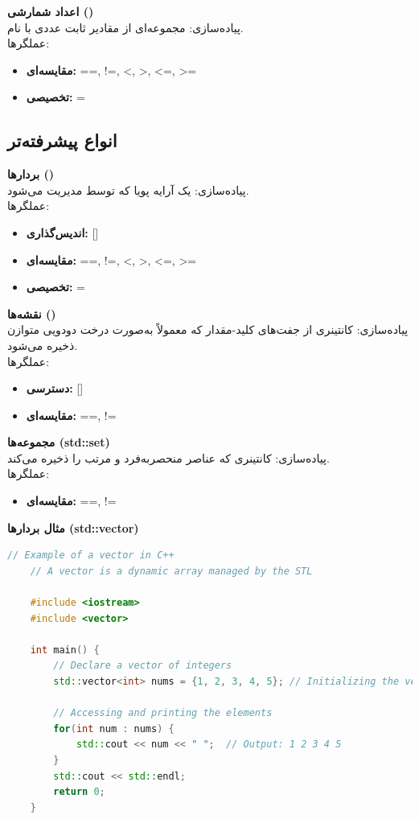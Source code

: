 \documentclass[12pt, a4paper]{report}
\begin{document}
\textbf{اعداد شمارشی ()} \\
پیاده‌سازی: مجموعه‌ای از مقادیر ثابت عددی با نام. \\
عملگرها:
\begin{itemize}
	\item \textbf{مقایسه‌ای:} ==, !=, <, >, <=, >=
	\item \textbf{تخصیصی:} =
\end{itemize}

\subsection{انواع پیشرفته‌تر}

\textbf{بردارها ()} \\
پیاده‌سازی: یک آرایه پویا که توسط  مدیریت می‌شود. \\
عملگرها:
\begin{itemize}
	\item \textbf{اندیس‌گذاری:} []
	\item \textbf{مقایسه‌ای:} ==, !=, <, >, <=, >=
	\item \textbf{تخصیصی:} =
\end{itemize}

\textbf{نقشه‌ها ()} \\
پیاده‌سازی: کانتینری از جفت‌های کلید-مقدار که معمولاً به‌صورت درخت دودویی متوازن ذخیره می‌شود. \\
عملگرها:
\begin{itemize}
	\item \textbf{دسترسی:} []
	\item \textbf{مقایسه‌ای:} ==, !=
\end{itemize}

\textbf{مجموعه‌ها (std::set)} \\
پیاده‌سازی: کانتینری که عناصر منحصربه‌فرد و مرتب را ذخیره می‌کند. \\
عملگرها:
\begin{itemize}
	\item \textbf{مقایسه‌ای:} ==, !=
\end{itemize}
\pagebreak
\textbf{مثال بردارها (std::vector)} \\
\LTR
\begin{lstlisting}[language=C++, breaklines=true]
	// Example of a vector in C++
	// A vector is a dynamic array managed by the STL
	
	#include <iostream>
	#include <vector>
	
	int main() {
		// Declare a vector of integers
		std::vector<int> nums = {1, 2, 3, 4, 5}; // Initializing the vector with values
		
		// Accessing and printing the elements
		for(int num : nums) {
			std::cout << num << " ";  // Output: 1 2 3 4 5
		}
		std::cout << std::endl;
		return 0;
	}
\end{lstlisting}
\RTL
\end{document}
